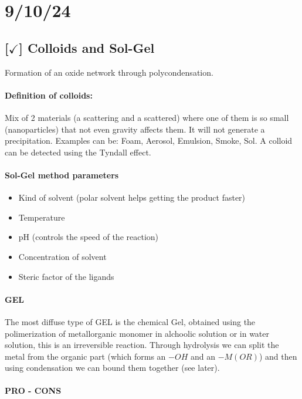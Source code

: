 \section{9/10/24}

\subsection{[$\checkmark$] Colloids and Sol-Gel}

Formation of an oxide network through polycondensation.

\paragraph{Definition of colloids: } Mix of 2 materials (a scattering and a scattered) where one of them is so small (nanoparticles) that not even gravity affects them. It will not generate a precipitation. Examples can be: Foam, Aerosol, Emulsion, Smoke, Sol. A colloid can be detected using the Tyndall effect.

\paragraph{Sol-Gel method parameters}
\begin{itemize}
    \item Kind of solvent (polar solvent helps getting the product faster)
    \item Temperature
    \item pH (controls the speed of the reaction)
    \item Concentration of solvent
    \item Steric factor of the ligands
\end{itemize}

\paragraph{GEL} The most diffuse type of GEL is the chemical Gel, obtained using the polimerization of metallorganic monomer in alchoolic solution or in water solution, this is an irreversible reaction. Through hydrolysis we can split the metal from the organic part (which forms an $-OH$ and an $-M(OR)$) and then using condensation we can bound them together (see later).

\paragraph{PRO - CONS}

